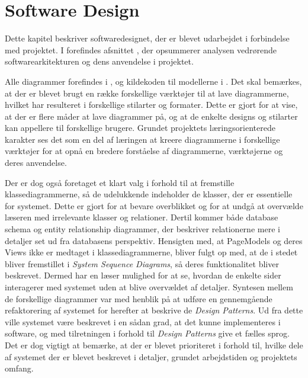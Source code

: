 \chapter{Software Design}
\label{chapter:software-design}
Dette kapitel beskriver softwaredesignet, der er blevet udarbejdet i forbindelse med projektet. 
I  forefindes afsnittet , der opsummerer analysen vedrørende softwarearkitekturen og dens anvendelse i projektet.

Alle diagrammer forefindes i , og kildekoden til modellerne i .
Det skal bemærkes, at der er blevet brugt en række forskellige værktøjer til at lave diagrammerne, hvilket har resulteret i forskellige stilarter og formater. 
Dette er gjort for at vise, at der er flere måder at lave diagrammer på, og at de enkelte designs og stilarter kan appellere til forskellige brugere.
Grundet projektets læringsorienterede karakter ses det som en del af læringen at kreere diagrammerne i forskellige værktøjer for at opnå en bredere forståelse af diagrammerne, værktøjerne og deres anvendelse.

Der er dog også foretaget et klart valg i forhold til at fremstille klassediagrammerne, så de udelukkende indeholder de klasser, der er essentielle for systemet.
Dette er gjort for at bevare overblikket og for at undgå at overvælde læseren med irrelevante klasser og relationer.
Dertil kommer både database schema og entity relationship diagrammer, der beskriver relationerne mere i detaljer set ud fra databasens perspektiv.
Hensigten med, at PageModels og deres Views ikke er medtaget i klassediagrammerne, bliver fulgt op med, at de i stedet bliver fremstillet i \emph{System Sequence Diagrams}, så deres funktionalitet bliver beskrevet.
Dermed har en læser mulighed for at se, hvordan de enkelte sider interagerer med systemet uden at blive overvældet af detaljer.
Syntesen mellem de forskellige diagrammer var med henblik på at udføre en gennemgående refaktorering af systemet for herefter at beskrive de \emph{Design Patterns}.
Ud fra dette ville systemet være beskrevet i en sådan grad, at det kunne implementeres i software, og med tilretningen i forhold til \emph{Design Patterns} give et fælles sprog.
Det er dog vigtigt at bemærke, at der er blevet prioriteret i forhold til, hvilke dele af systemet der er blevet beskrevet i detaljer, grundet arbejdstiden og projektets omfang.

